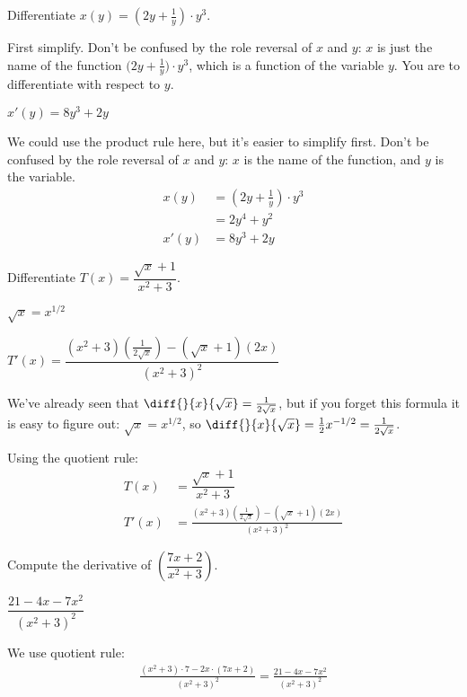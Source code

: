 \begin{Mquestion} Differentiate $x(y) = \left(2y+\frac{1}{y}\right)\cdot y^3$.
\end{Mquestion}
\begin{hint} First simplify. Don't be confused by the role reversal of $x$ and $y$: $x$ is just
        the name of the function $\big(2y+\tfrac{1}{y}\big)\cdot y^3$, which
        is a function of the variable $y$. You are to differentiate with
        respect to $y$.
\end{hint}
\begin{answer} $x'(y)=8y^3+2y$
\end{answer}
\begin{solution} We could use the product rule here, but it's easier to simplify first. Don't be confused by the role reversal of $x$ and $y$: $x$ is the name of the function, and $y$ is the variable.
\begin{align*}
x(y) &= \left(2y+\frac{1}{y}\right)\cdot y^3\\
&=2y^4+y^2\\
x'(y)&=8y^3+2y
\end{align*}
\end{solution}


\begin{Mquestion} Differentiate $T(x) = \dfrac{\sqrt{x}+1}{x^2+3}$.
\end{Mquestion}
\begin{hint} $\sqrt{x}=x^{1/2}$
\end{hint}
\begin{answer} $T'(x)=\dfrac{(x^2+3)\left(\frac{1}{2\sqrt{x}}\right)-(\sqrt{x}+1)(2x)}{(x^2+3)^2}$
\end{answer}
\begin{solution}
We've already seen that $\diff{}{x}\{\sqrt{x}\}=\frac{1}{2\sqrt{x}}$, but if you forget this formula it is easy to figure out: $\sqrt{x}=x^{1/2}$, so $\diff{}{x}\{\sqrt{x}\}=\frac{1}{2}x^{-1/2}=\frac{1}{2\sqrt{x}}$.

Using the quotient rule:
\begin{align*}
T(x) &= \dfrac{\sqrt{x}+1}{x^2+3}\\
T'(x)&=\frac{(x^2+3)\left(\frac{1}{2\sqrt{x}}\right)-(\sqrt{x}+1)(2x)}{(x^2+3)^2}
\end{align*}
\end{solution}


\begin{question}[2015Q]
Compute the derivative of $\left(\dfrac{7x+2}{x^2+3}\right)$.
\end{question}
\begin{answer}
$\dfrac{21-4x-7x^2}{(x^2+3)^2}$
\end{answer}
\begin{solution}
We use quotient rule:
\begin{align*}
\frac{(x^2+3)\cdot 7 - 2x\cdot (7x+2)}{(x^2+3)^2}=\frac{21 - 4x - 7x^2}{(x^2+3)^2}
\end{align*}
\end{solution}


